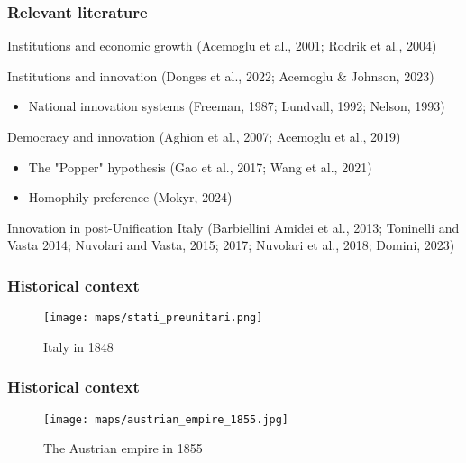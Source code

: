 \documentclass[10pt]{beamer}
\begin{document}
\begin{frame}
    \frametitle{Relevant literature}
    
    Institutions and economic growth (Acemoglu et al., 2001; Rodrik et al., 2004) \\  \bigskip

    Institutions and innovation (Donges et al., 2022; Acemoglu \& Johnson, 2023)
    \begin{itemize}
        \item National innovation systems (Freeman, 1987; Lundvall, 1992; Nelson, 1993)
    \end{itemize}
    
    \bigskip

    Democracy and innovation (Aghion et al., 2007; Acemoglu et al., 2019)
    \begin{itemize}
        \item The "Popper" hypothesis (Gao et al., 2017; Wang et al., 2021) 
        \item Homophily preference (Mokyr, 2024)
    \end{itemize}
    
    \bigskip

    Innovation in post-Unification Italy (Barbiellini Amidei et al., 2013; Toninelli and Vasta 2014; Nuvolari and Vasta, 2015; 2017; Nuvolari et al., 2018; Domini, 2023)
    
\end{frame}

\begin{frame}
    \frametitle{Historical context}
    
    \begin{figure}
        \centering
        \texttt{[image: maps/stati\_preunitari.png]}
        \caption{Italy in 1848}
        \label{fig:map_italy_1848}
    \end{figure}
    
\end{frame}

\begin{frame}
    \frametitle{Historical context}
    
    \begin{figure}
        \centering
        \texttt{[image: maps/austrian\_empire\_1855.jpg]}
        \caption{The Austrian empire in 1855}
        \label{fig:map_austria_1855}
    \end{figure}
    
\end{frame}
\end{document}
